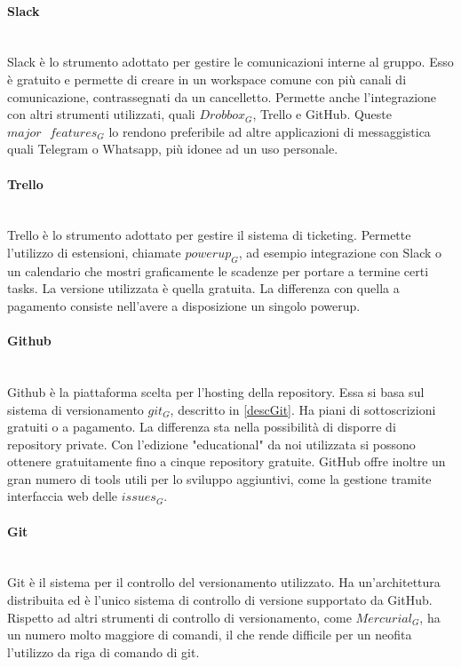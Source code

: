 		\paragraph{Slack}\mbox{} \\
		Slack è lo strumento adottato per gestire le comunicazioni interne al gruppo. Esso è gratuito e permette di creare in un workspace comune con più canali di comunicazione, contrassegnati da un cancelletto. Permette anche l'integrazione con altri strumenti utilizzati, quali $Drobbox_G$, Trello e GitHub. Queste $major\text{ }features_G$ lo rendono preferibile ad altre applicazioni di messaggistica quali Telegram o Whatsapp, più idonee ad un uso personale. 
		
		\paragraph{Trello} \mbox{} \\
		Trello è lo strumento adottato per gestire il sistema di ticketing. Permette l'utilizzo di estensioni, chiamate $powerup_G$, ad esempio integrazione con Slack o un calendario che mostri graficamente le scadenze per portare a termine certi tasks. La versione utilizzata è quella gratuita. La differenza con quella a pagamento consiste nell'avere a disposizione un singolo powerup.
		
		\paragraph{Github} \mbox{} \\
		Github è la piattaforma scelta per l'hosting della repository. Essa si basa sul sistema di versionamento $git_G$, descritto in \ref{descGit}. Ha piani di sottoscrizioni gratuiti o a pagamento. La differenza sta nella possibilità di disporre di repository private. Con l'edizione "educational" da noi utilizzata si possono ottenere gratuitamente fino a cinque repository gratuite. GitHub offre inoltre un gran numero di tools utili per lo sviluppo aggiuntivi, come la gestione tramite interfaccia web delle $issues_G$.
		
		\paragraph{Git} \mbox{} \\
		Git\label{descGit} è il sistema per il controllo del versionamento utilizzato. Ha un'architettura distribuita ed è l'unico sistema di controllo di versione supportato da GitHub. Rispetto ad altri strumenti di controllo di versionamento, come $Mercurial_G$, ha un numero molto maggiore di comandi, il che rende difficile per un neofita l'utilizzo da riga di comando di git.
		
